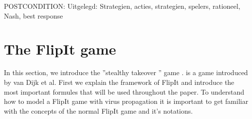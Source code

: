 POSTCONDITION: Uitgelegd: Strategien, acties, strategien, spelers, rationeel, Nash, best response





\section{The FlipIt game}
In this section, we introduce the ''stealthy takeover '' game  \cite{FlipIt}.  is a game introduced by van Dijk et al. First we explain the framework of FlipIt and introduce the most important formules that will be used throughout the paper. To understand how to model a FlipIt game with virus propagation it is important to get familiar with the concepts of the normal FlipIt game and it's notations.  \\

